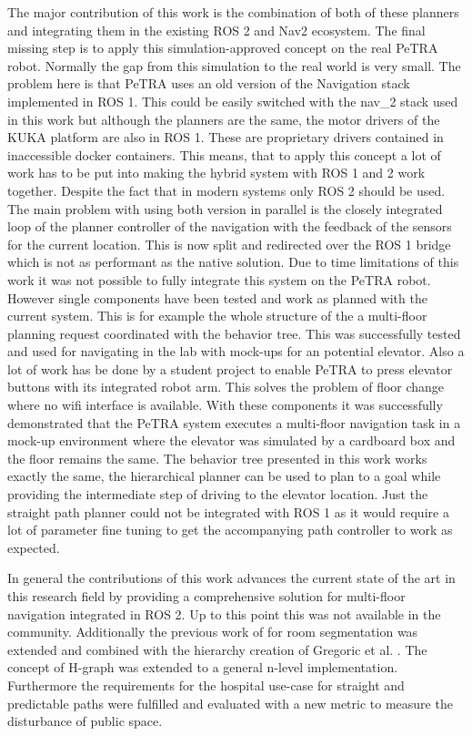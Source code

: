 The major contribution of this work is the combination of both of these planners and integrating them in the existing ROS 2 and Nav2 ecosystem. The final missing step is to apply this simulation-approved concept on the real PeTRA robot. Normally the gap from this simulation to the real world is very small. The problem here is that PeTRA uses an old version of the Navigation stack implemented in ROS 1. This could be easily switched with the \gls{nav_2} stack used in this work but although the planners are the same, the motor drivers of the KUKA platform are also in ROS 1. These are proprietary drivers contained in inaccessible docker containers. This means, that to apply this concept a lot of work has to be put into making the hybrid system with ROS 1 and 2 work together. Despite the fact that in modern systems only ROS 2 should be used. The main problem with using both version in parallel is the closely integrated loop of the planner controller of the navigation with the feedback of the sensors for the current location. This is now split and redirected over the ROS 1 bridge which is not as performant as the native solution. Due to time limitations of this work it was not possible to fully integrate this system on the PeTRA robot. However single components have been tested and work as planned with the current system. This is for example the whole structure of the a multi-floor planning request coordinated with the behavior tree. This was successfully tested and used for navigating in the lab with mock-ups for an potential elevator. Also a lot of work has be done by a student project to enable PeTRA to press elevator buttons with its integrated robot arm. This solves the problem of floor change where no wifi interface is available. With these components it was successfully demonstrated that the PeTRA system executes a multi-floor navigation task in a mock-up environment where the elevator was simulated by a cardboard box and the floor remains the same. The behavior tree presented in this work works exactly the same, the hierarchical planner can be used to plan to a goal while providing the intermediate step of driving to the elevator location. Just the straight path planner could not be integrated with ROS 1 as it would require a lot of parameter fine tuning to get the accompanying path controller to work as expected.

In general the contributions of this work advances the current state of the art in this research field by providing a comprehensive solution for multi-floor navigation integrated in ROS 2. Up to this point this was not available in the community. Additionally the previous work of \cite{ryu_hierarchical_2020} for room segmentation was extended and combined with the hierarchy creation of Gregoric et al. \cite{gregoric_autonomous_2022}. The concept of H-graph was extended to a general n-level implementation. Furthermore the requirements for the hospital use-case for straight and predictable paths were fulfilled and evaluated with a new metric to measure the disturbance of public space. 